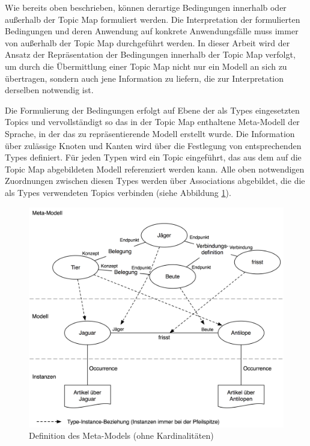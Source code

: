 Wie bereits oben beschrieben, können derartige Bedingungen innerhalb oder außerhalb der Topic Map formuliert werden. Die Interpretation der formulierten Bedingungen und deren Anwendung auf konkrete Anwendungsfälle muss immer von außerhalb der Topic Map durchgeführt werden. In dieser Arbeit wird der Ansatz der Repräsentation der Bedingungen innerhalb der Topic Map verfolgt, um durch die Übermittlung einer Topic Map nicht nur ein Modell an sich zu übertragen, sondern auch jene Information zu liefern, die zur Interpretation derselben notwendig ist.

Die Formulierung der Bedingungen erfolgt auf Ebene der als Types eingesetzten Topics und vervollständigt so das in der Topic Map enthaltene Meta-Modell der Sprache, in der das zu repräsentierende Modell erstellt wurde. Die Information über zulässige Knoten und Kanten wird über die Festlegung von entsprechenden Types definiert. Für jeden Typen wird ein Topic eingeführt, das aus dem auf die Topic Map abgebildeten Modell referenziert werden kann. Alle oben notwendigen Zuordnungen zwischen diesen Types werden über Associations abgebildet, die die als Types verwendeten Topics verbinden (siehe Abbildung \ref{fig:img_Persistenz_MetaModelDef}).

\begin{figure}[htbp]
	\centering
		\includegraphics[width=13cm]{img/Persistenz/MetaModelDef.png}
	\caption{Definition des Meta-Models (ohne Kardinalitäten)}
	\label{fig:img_Persistenz_MetaModelDef}
\end{figure}

